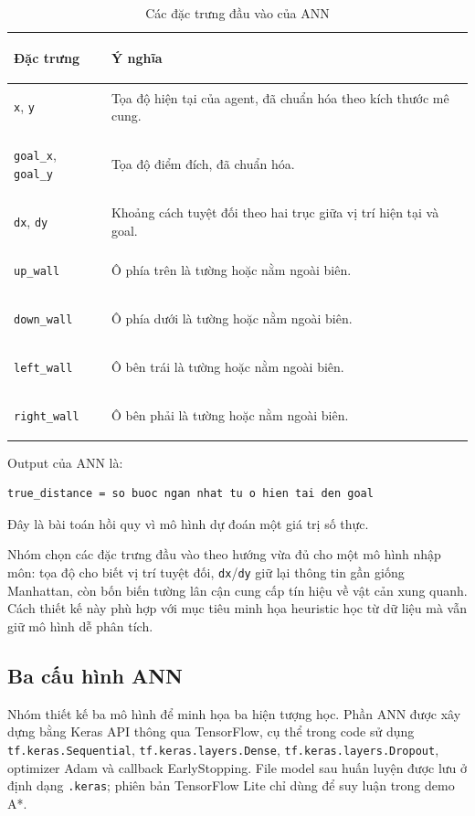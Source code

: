 \documentclass[12pt,a4paper]{article}
\begin{document}
\begin{table}[H]
\centering
\caption{Các đặc trưng đầu vào của ANN}
\begin{tabularx}{0.96\textwidth}{>{\bfseries\raggedright\arraybackslash}p{}Y}
\toprule
Đặc trưng & Ý nghĩa \\
\midrule
\texttt{x}, \texttt{y} & Tọa độ hiện tại của agent, đã chuẩn hóa theo kích thước mê cung. \\
\texttt{goal\_x}, \texttt{goal\_y} & Tọa độ điểm đích, đã chuẩn hóa. \\
\texttt{dx}, \texttt{dy} & Khoảng cách tuyệt đối theo hai trục giữa vị trí hiện tại và goal. \\
\texttt{up\_wall} & Ô phía trên là tường hoặc nằm ngoài biên. \\
\texttt{down\_wall} & Ô phía dưới là tường hoặc nằm ngoài biên. \\
\texttt{left\_wall} & Ô bên trái là tường hoặc nằm ngoài biên. \\
\texttt{right\_wall} & Ô bên phải là tường hoặc nằm ngoài biên. \\
\bottomrule
\end{tabularx}
\end{table}

Output của ANN là:

\begin{lstlisting}
true_distance = so buoc ngan nhat tu o hien tai den goal
\end{lstlisting}

Đây là bài toán hồi quy vì mô hình dự đoán một giá trị số thực.

Nhóm chọn các đặc trưng đầu vào theo hướng vừa đủ cho một mô hình nhập môn: tọa độ cho biết vị trí tuyệt đối, \texttt{dx}/\texttt{dy} giữ lại thông tin gần giống Manhattan, còn bốn biến tường lân cận cung cấp tín hiệu về vật cản xung quanh. Cách thiết kế này phù hợp với mục tiêu minh họa heuristic học từ dữ liệu mà vẫn giữ mô hình dễ phân tích.

\subsection{Ba cấu hình ANN}

Nhóm thiết kế ba mô hình để minh họa ba hiện tượng học. Phần ANN được xây dựng bằng Keras API thông qua TensorFlow, cụ thể trong code sử dụng \texttt{tf.keras.Sequential}, \texttt{tf.keras.layers.Dense}, \texttt{tf.keras.layers.Dropout}, optimizer Adam và callback \mbox{EarlyStopping}. File model sau huấn luyện được lưu ở định dạng \texttt{.keras}; phiên bản TensorFlow Lite chỉ dùng để suy luận trong demo A*.
\end{document}
